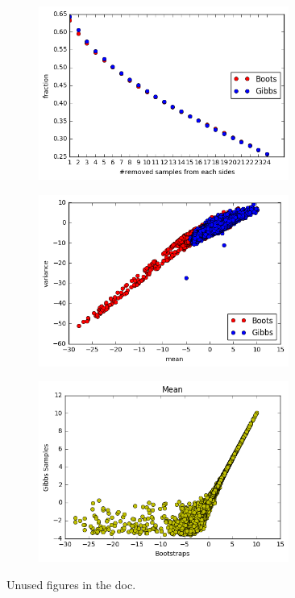 \documentclass{article}
\begin{document}
\begin{figure}
  \centering
  \begin{subfigure}[t]{0.30\textwidth}
    \centering
    \includegraphics[width=0.9\textwidth]{figures/subsample.png}
    \caption{ \label{fig:subsample}}
  \end{subfigure}
  \qquad
  \begin{subfigure}[t]{0.30\textwidth}
    \centering
      \includegraphics[width=0.9\textwidth]{figures/meanVvar.png}
      \caption{\label{fig:meanVvar}}
  \end{subfigure}
  \qquad
  \begin{subfigure}[t]{0.30\textwidth}
    \centering
      \includegraphics[width=0.9\textwidth]{figures/mean.png}
      \caption{\label{fig:mean}}
  \end{subfigure}
  \caption{Unused figures in the doc.}
\end{figure}

\end{document}
